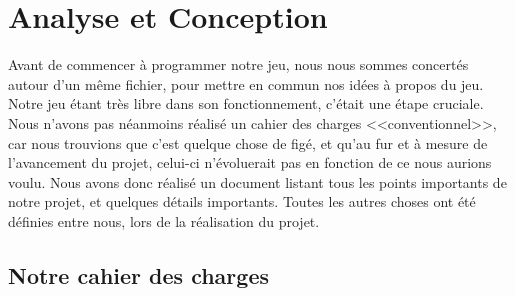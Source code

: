 \documentclass[11pt]{report}
\begin{document}
\chapter{Analyse et Conception}

	Avant de commencer à programmer notre jeu, nous nous sommes concertés autour d'un même fichier, pour mettre en commun nos idées à propos du jeu. Notre jeu étant très libre dans son fonctionnement, c'était une étape cruciale.\\
	Nous n'avons pas néanmoins réalisé un cahier des charges <<conventionnel>>, car nous trouvions que c'est quelque chose de figé, et qu'au fur et à mesure de l'avancement du projet, celui-ci n'évoluerait pas en fonction de ce nous aurions voulu. Nous avons donc réalisé un document listant tous les points importants de notre projet, et quelques détails importants. Toutes les autres choses ont été définies entre nous, lors de la réalisation du projet.

	\section{Notre cahier des charges}
\end{document}
